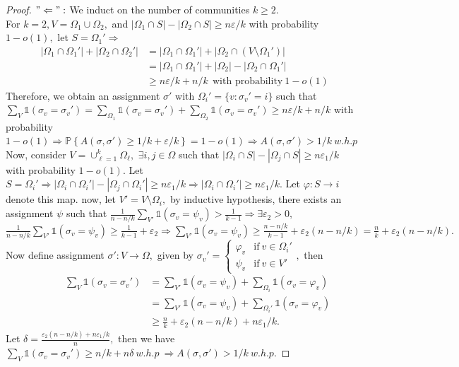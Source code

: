 \begin{proof}
    $"\Leftarrow":$ We induct on the number of communities $k\geq 2$.\\
    For $k=2, V=\Omega_1\cup\Omega_2,$ and $|\Omega_1\cap S|-|\Omega_2\cap S|\geq n\varepsilon/k$ with probability $1-o(1),$ let $S=\Omega_1'\Rightarrow$\begin{align*}
    ~|\Omega_1\cap\Omega_1'|+|\Omega_2\cap\Omega_2'|&=|\Omega_1\cap\Omega_1'|+|\Omega_2\cap(V\setminus\Omega_1')|\\
    &=|\Omega_1\cap\Omega_1'|+|\Omega_2|-|\Omega_2\cap\Omega_1'|\\
    &\geq n\varepsilon/k+n/k~~\text{with probability}~1-o(1)
    \end{align*}
    Therefore, we obtain an assignment $\sigma'$ with $\Omega_i'=\{v: \sigma_v'=i\}$ such that $\sum_V\mathbb{1}(\sigma_v=\sigma_v')=\sum_{\Omega_1}\mathbb{1}(\sigma_v=\sigma_v')+\sum_{\Omega_2}\mathbb{1}(\sigma_v=\sigma_v')\geq n\varepsilon/k+n/k$ with probability $1-o(1)\Rightarrow \mathbb{P}\left\{A(\sigma, \sigma')\geq1/k+\varepsilon/k\right\}=1-o(1)\Rightarrow A(\sigma, \sigma')>1/k~w.h.p$\\
    Now, consider $V=\cup_{\ell=1}^k\Omega_\ell,$ $\exists i, j\in\Omega$ such that $|\Omega_i\cap S|-|\Omega_j\cap S|\geq n\varepsilon_1/k$ with probability $1-o(1).$ Let $S=\Omega_i'\Rightarrow|\Omega_i\cap\Omega_i'|-|\Omega_j\cap\Omega_i'|\geq n\varepsilon_1/k\Rightarrow |\Omega_i\cap\Omega_i'|\geq n\varepsilon_1/k.$ Let $\varphi: S\rightarrow i$ denote this map. now, let $V'=V\setminus\Omega_i,$ by inductive hypothesis, there exists an assignment $\psi$ such that $\frac{1}{n-n/k}\sum_{V'}\mathbb{1}(\sigma_v=\psi_v)>\frac{1}{k-1}\Rightarrow\exists\varepsilon_2>0,$ $\frac{1}{n-n/k}\sum_{V'}\mathbb{1}(\sigma_v=\psi_v)\geq\frac{1}{k-1}+\varepsilon_2\Rightarrow\sum_{V'}\mathbb{1}(\sigma_v=\psi_v)\geq\frac{n-n/k}{k-1}+\varepsilon_2(n-n/k)=\frac{n}{k}+\varepsilon_2(n-n/k).$ Now define assignment $\sigma': V\rightarrow\Omega,$ given by $\sigma_v'=\begin{cases}
        \varphi_v & \text{if}~v\in\Omega_i'\\
        \psi_v & \text{if}~v\in V'
    \end{cases},$ then \begin{align*}
        ~~~~~~~~~~~~~\sum_V\mathbb{1}(\sigma_v=\sigma_v')&=\sum_{V'}\mathbb{1}(\sigma_v=\psi_v)+\sum_{\Omega_i}\mathbb{1}(\sigma_v=\varphi_v)\\
        &=\sum_{V'}\mathbb{1}(\sigma_v=\psi_v)+\sum_{\Omega_i'}\mathbb{1}(\sigma_v=\varphi_v)\\
        &\geq\frac{n}{k}+\varepsilon_2(n-n/k)+n\varepsilon_1/k.
    \end{align*}
    Let $\delta=\frac{\varepsilon_2(n-n/k)+n\varepsilon_1/k}{n},$ then we have $\sum_V\mathbb{1}(\sigma_v=\sigma_v')\geq n/k+n\delta~w.h.p~\Rightarrow A(\sigma, \sigma')>1/k~w.h.p.$
\end{proof}

